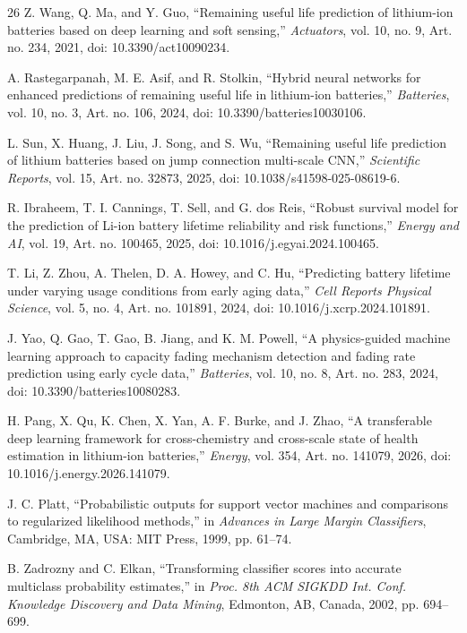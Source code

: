 \documentclass[conference]{IEEEtran}
\begin{document}
\begin{thebibliography}{26}
 Z. Wang, Q. Ma, and Y. Guo, ``Remaining useful life prediction of lithium-ion batteries based on deep learning and soft sensing,'' \emph{Actuators}, vol. 10, no. 9, Art. no. 234, 2021, doi: 10.3390/act10090234.

 A. Rastegarpanah, M. E. Asif, and R. Stolkin, ``Hybrid neural networks for enhanced predictions of remaining useful life in lithium-ion batteries,'' \emph{Batteries}, vol. 10, no. 3, Art. no. 106, 2024, doi: 10.3390/batteries10030106.

 L. Sun, X. Huang, J. Liu, J. Song, and S. Wu, ``Remaining useful life prediction of lithium batteries based on jump connection multi-scale CNN,'' \emph{Scientific Reports}, vol. 15, Art. no. 32873, 2025, doi: 10.1038/s41598-025-08619-6.

 R. Ibraheem, T. I. Cannings, T. Sell, and G. dos Reis, ``Robust survival model for the prediction of Li-ion battery lifetime reliability and risk functions,'' \emph{Energy and AI}, vol. 19, Art. no. 100465, 2025, doi: 10.1016/j.egyai.2024.100465.

 T. Li, Z. Zhou, A. Thelen, D. A. Howey, and C. Hu, ``Predicting battery lifetime under varying usage conditions from early aging data,'' \emph{Cell Reports Physical Science}, vol. 5, no. 4, Art. no. 101891, 2024, doi: 10.1016/j.xcrp.2024.101891.

 J. Yao, Q. Gao, T. Gao, B. Jiang, and K. M. Powell, ``A physics-guided machine learning approach to capacity fading mechanism detection and fading rate prediction using early cycle data,'' \emph{Batteries}, vol. 10, no. 8, Art. no. 283, 2024, doi: 10.3390/batteries10080283.

 H. Pang, X. Qu, K. Chen, X. Yan, A. F. Burke, and J. Zhao, ``A transferable deep learning framework for cross-chemistry and cross-scale state of health estimation in lithium-ion batteries,'' \emph{Energy}, vol. 354, Art. no. 141079, 2026, doi: 10.1016/j.energy.2026.141079.

 J. C. Platt, ``Probabilistic outputs for support vector machines and comparisons to regularized likelihood methods,'' in \emph{Advances in Large Margin Classifiers}, Cambridge, MA, USA: MIT Press, 1999, pp. 61--74.

 B. Zadrozny and C. Elkan, ``Transforming classifier scores into accurate multiclass probability estimates,'' in \emph{Proc. 8th ACM SIGKDD Int. Conf. Knowledge Discovery and Data Mining}, Edmonton, AB, Canada, 2002, pp. 694--699.


\end{thebibliography}
\end{document}
